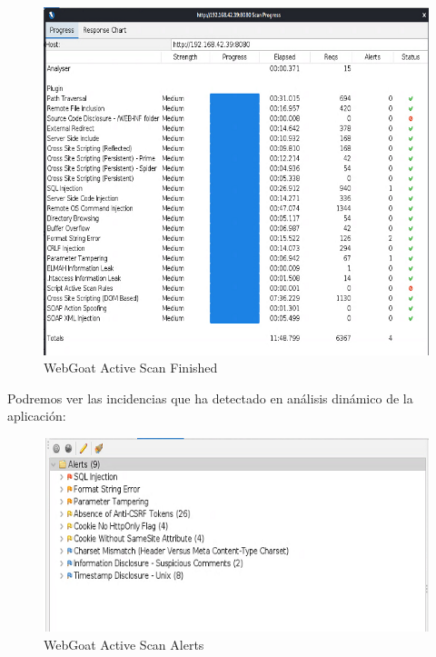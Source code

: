 \begin{figure}[!htb]
    \centering
    \captionsetup{width=1\linewidth}  
    \includegraphics[scale=0.7]{./imagenes/04_1_1_04_WebGoat_ZapProxyActiveScanResult.png}
    \caption{WebGoat Active Scan Finished}  
    \label{fig:WebGoat Active Scan Finished}
\end{figure}

\newpage
Podremos ver las incidencias que ha detectado en análisis dinámico de la aplicación:\\

\begin{figure}[!htb]
    \centering
    \captionsetup{width=1\linewidth}
    \begin{center}
        \includegraphics[width=\linewidth]{./imagenes/04_1_1_05_WebGoat_ZapProxyActiveScanAlert.png}
    \end{center}  
    \caption{WebGoat Active Scan Alerts}  
    \label{fig:WebGoat Active Scan Alerts}
\end{figure}


